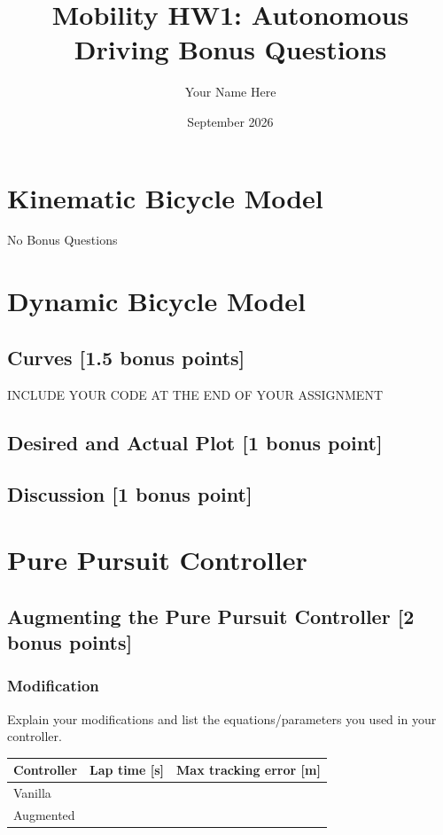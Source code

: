 \documentclass{article}
\title{Mobility HW1: Autonomous Driving Bonus Questions}
\author{Your Name Here}
\date{September 2026}
\begin{document}
\maketitle
\section{Kinematic Bicycle Model}

No Bonus Questions

\section{Dynamic Bicycle Model}

\subsection{Curves [1.5 bonus points]} \label{plots}
INCLUDE YOUR CODE AT THE END OF YOUR ASSIGNMENT

\subsection{Desired and Actual Plot [1 bonus point]}

\subsection{Discussion [1 bonus point]}

\section{Pure Pursuit Controller}

\subsection{Augmenting the Pure Pursuit Controller [2 bonus points]}

\subsubsection{Modification}
Explain your modifications and list the equations/parameters you used in your controller.

\vspace{3mm}
\begin{tabular}{lcc}
Controller & Lap time [s] & Max tracking error [m] \\
\hline
Vanilla & & \\
Augmented & & \\
\end{tabular}
\end{document}
